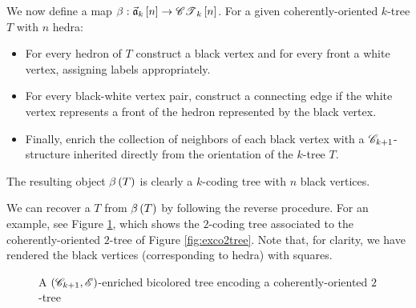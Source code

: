\documentclass[sectionflow,singlespace,twoside,boldmathhdr,draft]{brandiss} %
\numberwithin{section}{chapter}
\numberwithin{figure}{chapter}
\begin{document}
We now define a map $\beta: \vec{\mathfrak{a}}_{k} \left[ {n} \right] \to \mathscr{CT}_{k} \left[ {n} \right]$.
For a given coherently-oriented $k$-tree $T$ with $n$ hedra:
\begin{itemize}
  \item For every hedron of $T$ construct a black vertex and for every front a white vertex, assigning labels appropriately.
  \item For every black-white vertex pair, construct a connecting edge if the white vertex represents a front of the hedron represented by the black vertex.
  \item Finally, enrich the collection of neighbors of each black vertex with a $\mathscr{C}_{k+1}$-structure inherited directly from the orientation of the $k$-tree $T$.
\end{itemize}
The resulting object $\beta \left( {T} \right)$ is clearly a $k$-coding tree with $n$ black vertices.

We can recover a $T$ from $\beta \left( {T} \right)$ by following the reverse procedure.
For an example, see Figure \ref{fig:exbctree}, which shows the $2$-coding tree associated to the coherently-oriented $2$-tree of Figure \ref{fig:exco2tree}.
Note that, for clarity, we have rendered the black vertices (corresponding to hedra) with squares.

\begin{figure}[htb]
  \centering
  \caption{A $\left( {\mathscr{C}_{k+1}, \mathscr{E}} \right)$-enriched bicolored tree encoding a coherently-oriented $2$-tree}
  \label{fig:exbctree}
\end{figure}
\end{document}
